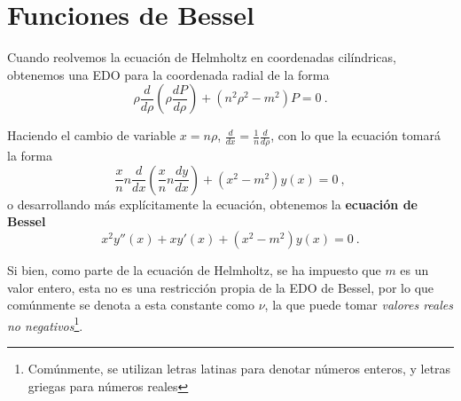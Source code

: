 \chapter{Funciones de Bessel}

Cuando reolvemos la ecuación de Helmholtz en coordenadas cilíndricas, obtenemos una EDO para la coordenada radial de la forma
\begin{equation}
    \rho \frac{d}{d\rho}\left( \rho \frac{dP}{d\rho} \right) + (n^2\rho^2 - m^2)P = 0 \ .
\end{equation}

Haciendo el cambio de variable $x = n\rho$, $\frac{d}{dx} = \frac{1}{n} \frac{d}{d\rho}$, con lo que la ecuación tomará la forma
\begin{equation}
    \frac{x}{n} n \frac{d}{dx} \left( \frac{x}{n} n \frac{dy}{dx} \right) + (x^2 - m^2)y(x) = 0 \ ,
\end{equation}
o desarrollando más explícitamente la ecuación, obtenemos la \textbf{ecuación de Bessel}
\begin{equation}
    x^2 y''(x) + x y'(x) + (x^2 - m^2) y(x) = 0 \ .
\end{equation}

Si bien, como parte de la ecuación de Helmholtz, se ha impuesto que $m$ es un valor entero, esta no es una restricción propia de la EDO de Bessel, por lo que comúnmente se denota a esta constante como $\nu$, la que puede tomar \emph{valores reales no negativos}\footnote{Comúnmente, se utilizan letras latinas para denotar números enteros, y letras griegas para números reales}.


